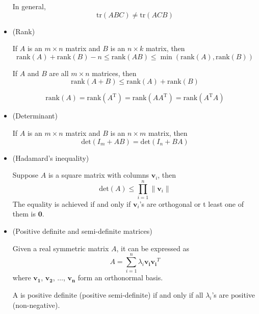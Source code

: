 \documentclass{article}
\begin{document}
\begin{itemize}
In general,
\begin{equation}
\mathrm{tr}(ABC)\ne\mathrm{tr}(ACB)
\end{equation}

\item (Rank)

If $A$ is an $m\times n$ matrix and $B$ is an $n\times k$ matrix, then
\begin{equation} \label{rofp}
\mathrm{rank}(A)+\mathrm{rank}(B)-n\le\mathrm{rank}(AB)\le\min(\mathrm{rank}(A),\mathrm{rank}(B))
\end{equation}

If $A$ and $B$ are all $m\times n$ matrices, then
\begin{equation}\label{rofs}
\mathrm{rank}(A+B)\le\mathrm{rank}(A)+\mathrm{rank}(B)
\end{equation}

\begin{equation}\label{rofaat}
\mathrm{rank}(A)=\mathrm{rank}(A^{\mathrm{T}})=\mathrm{rank}(AA^{\mathrm{T}})=\mathrm{rank}(A^{\mathrm{T}}A)
\end{equation}

\item (Determinant)

If $A$ is an $m\times n$ matrix and $B$ is an $n\times m$ matrix, then
\begin{equation}\label{syl}
\mathrm{det}(I_m+AB)=\mathrm{det}(I_n+BA)
\end{equation}

\item (Hadamard's inequality)

Suppose $A$ is a square matrix with columns $\mathbf{v}_i$, then
\begin{equation}\label{hadai}
\mathrm{det}(A)\le\prod_{i=1}^n\|\mathbf{v}_i\|
\end{equation}
The equality is achieved if and only if $\mathbf{v}_i$'s are orthogonal or t least one of them is $\mathbf{0}$.

\item (Positive definite and semi-definite matrices)

Given a real symmetric matrix $A$, it can be expressed as
\begin{equation}\label{realsym}
A=\sum_{i=1}^n\lambda_i\mathbf{v_i}\mathbf{v_i}^T
\end{equation}
where $\mathbf{v_1}$, $\mathbf{v_2}$, $\ldots$, $\mathbf{v_n}$ form an orthonormal basis.

A is positive definite (positive semi-definite) if and only if all $\lambda_i$'s are positive (non-negative).


\end{itemize}
\end{document}
